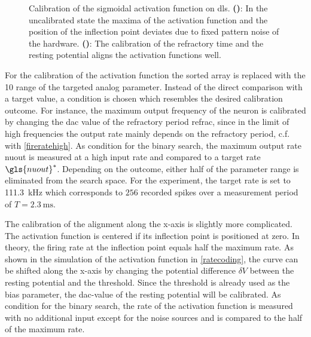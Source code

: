\begin{figure}[tb!]
	\centering
	\begin{subfigure}[b]{0.49\textwidth}
		\caption{}
		
		\label{transferfunction_wout_calib}
	\end{subfigure}
	\begin{subfigure}[b]{0.49\textwidth}		
		\caption{}
		
		\label{transferfunction_w_calib}
	\end{subfigure}
	\caption[Calibration of the sigmoidal activation function on \acrshort{dls}.]{Calibration of the sigmoidal activation function on \acrshort{dls}. \textbf{()}: In the uncalibrated state the maxima of the activation function and the position of the inflection point deviates due to fixed pattern noise of the hardware. \textbf{()}: The calibration of the refractory time and the resting potential aligns the activation functions well.}
\end{figure}

For the calibration of the activation function the sorted array is replaced with the \SI{10}{\bit} range of the targeted analog parameter. Instead of the direct comparison with a target value, a condition is chosen which resembles the desired calibration outcome. For instance, the maximum output frequency of the neuron is calibrated
by changing the \gls{dac} value of the refractory period \gls{refrac}, since in the limit of high frequencies the output rate mainly depends on the refractory period, c.f. with \cref{fireratehigh}. As condition for the binary search, the maximum output rate \gls{nuout} is measured at a high input rate and compared to a target rate $\gls{nuout}^*$. Depending on the outcome, either half of the parameter range is eliminated from the search space.
For the experiment, the target rate is set to \SI{111.3}{\kilo \Hz} which corresponds to $256$ recorded spikes over a measurement period of $T=\SI{2.3}{\milli \s}$.

The calibration of the alignment along the x-axis is slightly more complicated. The activation function is centered if its inflection point is positioned at zero. In theory, the firing rate at the inflection point equals half the maximum rate. As shown in the simulation of the activation function in \cref{ratecoding}, the curve can be shifted along the x-axis by changing the potential difference $\delta V$ between the resting potential and the threshold. Since the threshold is already used as the bias parameter, the \gls{dac}-value of the resting potential will be calibrated. As condition for the binary search, the rate of the activation function is measured with no additional input except for the noise sources and is compared to the half of the maximum rate.

